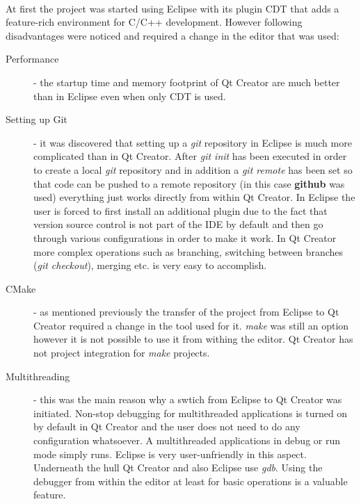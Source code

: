 \paragraph{}
  At first the project was started using Eclipse with its plugin CDT that adds a feature-rich environment for C/C++ development. However following disadvantages were noticed and required a change in the editor that was used:
\begin{description}
\item[Performance] - the startup time and memory footprint of Qt Creator are much better than in Eclipse even when only CDT is used.
\item[Setting up Git] - it was discovered that setting up a \textit{git} repository in Eclipse is much more complicated than in Qt Creator. After \textit{git init} has been executed in order to create a local \textit{git} repository and in addition a \textit{git remote} has been set so that code can be pushed to a remote repository (in this case \textbf{github} was used) everything just works directly from within Qt Creator. In Eclipse the user is forced to first install an additional plugin due to the fact that version source control is not part of the IDE by default and then go through various configurations in order to make it work. In Qt Creator more complex operations such as branching, switching between branches (\textit{git checkout}), merging etc. is very easy to accomplish.
\item[CMake] - as mentioned previously the transfer of the project from Eclipse to Qt Creator required a change in the tool used for it. \textit{make} was still an option however it is not possible to use it from withing the editor. Qt Creator has not project integration for \textit{make} projects.
\item[Multithreading] - this was the main reason why a swtich from Eclipse to Qt Creator was initiated. Non-stop debugging for multithreaded applications is turned on by default in Qt Creator and the user does not need to do any configuration whatsoever. A multithreaded applications in debug or run mode simply runs. Eclipse is very user-unfriendly in this aspect. Underneath the hull Qt Creator and also Eclipse use \textit{gdb}. Using the debugger from within the editor at least for basic operations is a valuable feature.
\end{description}